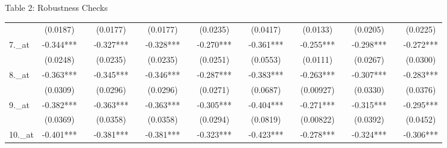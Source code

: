 \documentclass{beamer}
\begin{document}
\begin{frame}{Table 2: Robustness Checks}
\begin{table}[htbp]
\begin{adjustbox}{max width=\textwidth}
\begin{tabular}{llllllllllllllll}
          & \multicolumn{1}{c}{(0.0187)} &       & \multicolumn{1}{c}{(0.0177)} &       & \multicolumn{1}{c}{(0.0177)} &       & \multicolumn{1}{c}{(0.0235)} &       & \multicolumn{1}{c}{(0.0417)} &       & \multicolumn{1}{c}{(0.0133)} &       & \multicolumn{1}{c}{(0.0205)} &       & \multicolumn{1}{c}{(0.0225)} \\
    7.\_at & \multicolumn{1}{c}{-0.344***} &       & \multicolumn{1}{c}{-0.327***} &       & \multicolumn{1}{c}{-0.328***} &       & \multicolumn{1}{c}{-0.270***} &       & \multicolumn{1}{c}{-0.361***} &       & \multicolumn{1}{c}{-0.255***} &       & \multicolumn{1}{c}{-0.298***} &       & \multicolumn{1}{c}{-0.272***} \\
          & \multicolumn{1}{c}{(0.0248)} &       & \multicolumn{1}{c}{(0.0235)} &       & \multicolumn{1}{c}{(0.0235)} &       & \multicolumn{1}{c}{(0.0251)} &       & \multicolumn{1}{c}{(0.0553)} &       & \multicolumn{1}{c}{(0.0111)} &       & \multicolumn{1}{c}{(0.0267)} &       & \multicolumn{1}{c}{(0.0300)} \\
    8.\_at & \multicolumn{1}{c}{-0.363***} &       & \multicolumn{1}{c}{-0.345***} &       & \multicolumn{1}{c}{-0.346***} &       & \multicolumn{1}{c}{-0.287***} &       & \multicolumn{1}{c}{-0.383***} &       & \multicolumn{1}{c}{-0.263***} &       & \multicolumn{1}{c}{-0.307***} &       & \multicolumn{1}{c}{-0.283***} \\
          & \multicolumn{1}{c}{(0.0309)} &       & \multicolumn{1}{c}{(0.0296)} &       & \multicolumn{1}{c}{(0.0296)} &       & \multicolumn{1}{c}{(0.0271)} &       & \multicolumn{1}{c}{(0.0687)} &       & \multicolumn{1}{c}{(0.00927)} &       & \multicolumn{1}{c}{(0.0330)} &       & \multicolumn{1}{c}{(0.0376)} \\
    9.\_at & \multicolumn{1}{c}{-0.382***} &       & \multicolumn{1}{c}{-0.363***} &       & \multicolumn{1}{c}{-0.363***} &       & \multicolumn{1}{c}{-0.305***} &       & \multicolumn{1}{c}{-0.404***} &       & \multicolumn{1}{c}{-0.271***} &       & \multicolumn{1}{c}{-0.315***} &       & \multicolumn{1}{c}{-0.295***} \\
          & \multicolumn{1}{c}{(0.0369)} &       & \multicolumn{1}{c}{(0.0358)} &       & \multicolumn{1}{c}{(0.0358)} &       & \multicolumn{1}{c}{(0.0294)} &       & \multicolumn{1}{c}{(0.0819)} &       & \multicolumn{1}{c}{(0.00822)} &       & \multicolumn{1}{c}{(0.0392)} &       & \multicolumn{1}{c}{(0.0452)} \\
   10.\_at & \multicolumn{1}{c}{-0.401***} &       & \multicolumn{1}{c}{-0.381***} &       & \multicolumn{1}{c}{-0.381***} &       & \multicolumn{1}{c}{-0.323***} &       & \multicolumn{1}{c}{-0.423***} &       & \multicolumn{1}{c}{-0.278***} &       & \multicolumn{1}{c}{-0.324***} &       & \multicolumn{1}{c}{-0.306***} \\

\end{tabular}
\end{adjustbox}
\end{table}
\end{frame}
\end{document}
